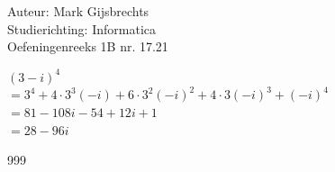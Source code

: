 \documentclass[a4paper]{article}
\begin{document}
\noindent \large Auteur: Mark Gijsbrechts \\
\noindent \large Studierichting: Informatica\\
\noindent \large Oefeningenreeks 1B nr. 17.21\\

\medskip

\normalsize



$\left(3 - i\right)^4$ \\

$=3^4 + 4 \cdot 3^3 (-i) + 6 \cdot 3^2 (-i)^2 + 4 \cdot 3(-i)^3 + (-i)^4$ \\

$= 81 -108i -54 + 12i + 1$ \\

$= 28 - 96i$ \\

\begin{thebibliography}{999}
\end{thebibliography}
\end{document}
